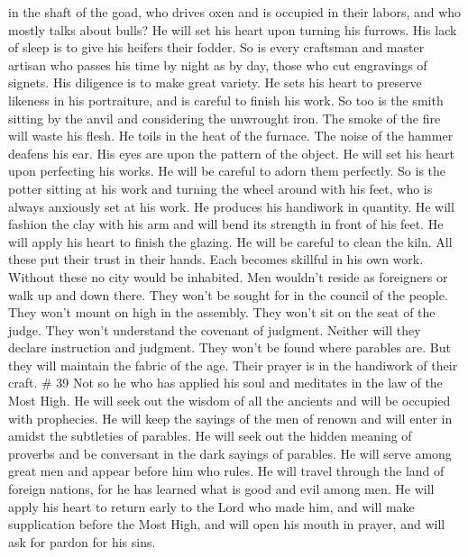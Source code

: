 in the shaft of the goad, who drives oxen and is occupied in their
labors, and who mostly talks about bulls?  He will set his
heart upon turning his furrows. His lack of sleep is to give his heifers
their fodder.  So is every craftsman and master artisan who
passes his time by night as by day, those who cut engravings of signets.
His diligence is to make great variety. He sets his heart to preserve
likeness in his portraiture, and is careful to finish his work.
 So too is the smith sitting by the anvil and considering
the unwrought iron. The smoke of the fire will waste his flesh. He toils
in the heat of the furnace. The noise of the hammer deafens his ear. His
eyes are upon the pattern of the object. He will set his heart upon
perfecting his works. He will be careful to adorn them perfectly.
 So is the potter sitting at his work and turning the wheel
around with his feet, who is always anxiously set at his work. He
produces his handiwork in quantity.  He will fashion the
clay with his arm and will bend its strength in front of his feet. He
will apply his heart to finish the glazing. He will be careful to clean
the kiln.  All these put their trust in their hands. Each
becomes skillful in his own work.  Without these no city
would be inhabited. Men wouldn't reside as foreigners or walk up and
down there.  They won't be sought for in the council of the
people. They won't mount on high in the assembly. They won't sit on the
seat of the judge. They won't understand the covenant of judgment.
Neither will they declare instruction and judgment. They won't be found
where parables are.  But they will maintain the fabric of
the age. Their prayer is in the handiwork of their craft. \# 39
 Not so he who has applied his soul and meditates in the law
of the Most High. He will seek out the wisdom of all the ancients and
will be occupied with prophecies.  He will keep the sayings
of the men of renown and will enter in amidst the subtleties of
parables.  He will seek out the hidden meaning of proverbs
and be conversant in the dark sayings of parables.  He will
serve among great men and appear before him who rules. He will travel
through the land of foreign nations, for he has learned what is good and
evil among men.  He will apply his heart to return early to
the Lord who made him, and will make supplication before the Most High,
and will open his mouth in prayer, and will ask for pardon for his sins.
